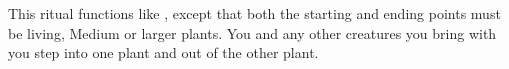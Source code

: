 \begin{spelleffect}
This ritual functions like , except that both the starting and ending points must be living, Medium or larger plants. You and any other creatures you bring with you step into one plant and out of the other plant.
\end{spelleffect}
\begin{comment}
You can enter any normal plant (Medium or larger) and pass any distance to a plant of the same kind in a single round, regardless of the distance separating the two. The entry plant must be alive. The destination plant need not be familiar to you, but it also must be alive. If you are uncertain of the location of a particular kind of destination plant, you need merely designate direction and distance and the transport via plants spell moves you as close as possible to the desired location. If a particular destination plant is desired but the plant is not living, the spell fails and you are ejected from the entry plant.
\par After completing the spell, you and anyone bring with you can't take any actions until the next turn that each creature would have.
\par You can bring along objects as long as their weight doesn't exceed your maximum load. You may also bring one additional willing Medium or smaller creature (carrying gear or objects up to its maximum load) or its equivalent per three caster levels. Use the following equivalents to determine the maximum number of larger creatures you can bring along: A Large creature counts as two Medium creatures, a Huge creature counts as two Large creatures, and so forth. All creatures to be transported must be in contact with one another, and at least one of those creatures must be in contact with you.
\par You can't use this spell to travel through plant creatures.
\par The destruction of an occupied plant slays you and any creatures you have brought along, and ejects the bodies and all carried objects from the tree.
\end{comment}

